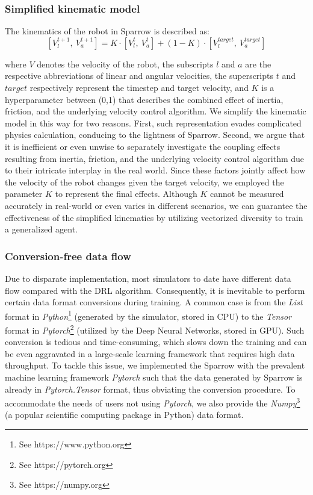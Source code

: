\documentclass[journal]{IEEEtran}
\begin{document}
\subsubsection{Simplified kinematic model}
The kinematics of the robot in Sparrow is described as:
\begin{equation}
	\label{knmic}
	[V^{t+1}_{l},\ V^{t+1}_{a}] = K·[V^{t}_{l},\ V^{t}_{a}]+(1-K)·[V^{target}_{l},\ V^{target}_{a}]
\end{equation}

\noindent where $V$ denotes the velocity of the robot, the subscripts $l$ and $a$ are the respective abbreviations of linear and angular velocities, the superscripts $t$ and $target$ respectively represent the timestep and target velocity, and $K$ is a hyperparameter between (0,1) that describes the combined effect of inertia, friction, and the underlying velocity control algorithm. We simplify the kinematic model in this way for two reasons. First, such representation evades complicated physics calculation, conducing to the lightness of Sparrow. Second, we argue that it is inefficient or even unwise to separately investigate the coupling effects resulting from inertia, friction, and the underlying velocity control algorithm due to their intricate interplay in the real world. Since these factors jointly affect how the velocity of the robot changes given the target velocity, we employed the parameter $K$ to represent the final effects. Although $K$ cannot be measured accurately in real-world or even varies in different scenarios, we can guarantee the effectiveness of the simplified kinematics by utilizing vectorized diversity to train a generalized agent.

\subsubsection{Conversion-free data flow}
Due to disparate implementation, most simulators to date have different data flow compared with the DRL algorithm. Consequently, it is inevitable to perform certain data format conversions during training. A common case is from the \textit{List} format in \textit{Python}\footnote{See https://www.python.org} (generated by the simulator, stored in CPU) to the \textit{Tensor} format in \textit{Pytorch}\footnote{See https://pytorch.org} (utilized by the Deep Neural Networks, stored in GPU). Such conversion is tedious and time-consuming, which slows down the training and can be even aggravated in a large-scale learning framework that requires high data throughput. To tackle this issue, we implemented the Sparrow with the prevalent machine learning framework \textit{Pytorch} such that the data generated by Sparrow is already in \textit{Pytorch.Tensor} format, thus obviating the conversion procedure. To accommodate the needs of users not using \textit{Pytorch}, we also provide the \textit{Numpy}\footnote{See https://numpy.org} (a popular scientific computing package in Python) data format.
\end{document}
